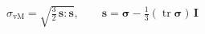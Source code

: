 \documentclass[border=4pt,varwidth=\maxdimen]{standalone}
\begin{document}
\fontsize{14}{20}\selectfont
$\sigma_{\mathrm{vM}}=\sqrt{\tfrac32\,\mathbf s:\mathbf s},\qquad \mathbf s=\boldsymbol\sigma-\tfrac13(\operatorname{tr}\boldsymbol\sigma)\,\mathbf I$
\end{document}
